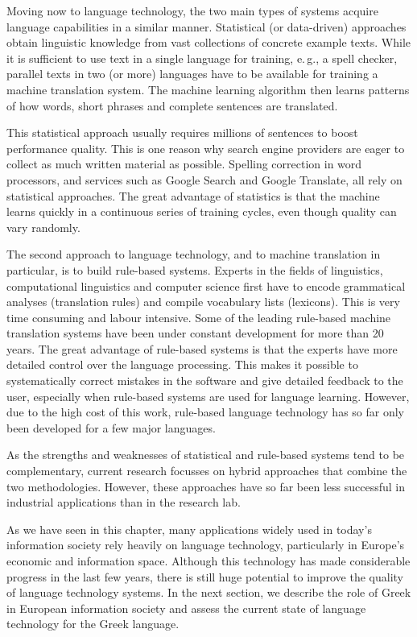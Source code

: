 \begin{multicols}{2}
Moving now to language technology, the two main types of systems acquire language capabilities in a similar manner. Statistical (or data-driven) approaches obtain linguistic knowledge from vast collections of concrete example texts. While it is sufficient to use text in a single language for training, e.\,g., a spell checker, parallel texts in two (or more) languages have to be available for training a machine translation system. The machine learning algorithm then learns patterns of how words, short phrases and complete sentences are translated. 

This statistical approach usually requires millions of sentences to boost performance quality. This is one reason why search engine providers are eager to collect as much written material as possible. Spelling correction in word processors, and services such as Google Search and Google Translate, all rely on statistical approaches. The great advantage of statistics is that the machine learns quickly in a continuous series of training cycles, even though quality can vary randomly.

The second approach to language technology, and to machine translation in particular, is to build rule-based systems. Experts in the fields of linguistics, computational linguistics and computer science first have to encode grammatical analyses (translation rules) and compile vocabulary lists (lexicons). This is very time consuming and labour intensive. Some of the leading rule-based machine translation systems have been under constant development for more than 20 years. The great advantage of rule-based systems is that the experts have more detailed control over the language processing. This makes it possible to systematically correct mistakes in the software and give detailed feedback to the user, especially when rule-based systems are used for language learning. However, due to the high cost of this work, rule-based language technology has so far only been developed for a few major languages. 


As the strengths and weaknesses of statistical and rule-based systems tend to be complementary, current research focusses on hybrid approaches that combine the two methodologies. However, these approaches have so far been less successful in industrial applications than in the research lab. 

As we have seen in this chapter, many applications widely used in today’s information society rely heavily on language technology, particularly in Europe’s economic and information space. Although this technology has made considerable progress in the last few years, there is still huge potential to improve the quality of language technology systems. In the next section, we describe the role of Greek in European information society and assess the current state of language technology for the Greek language.
\end{multicols}

